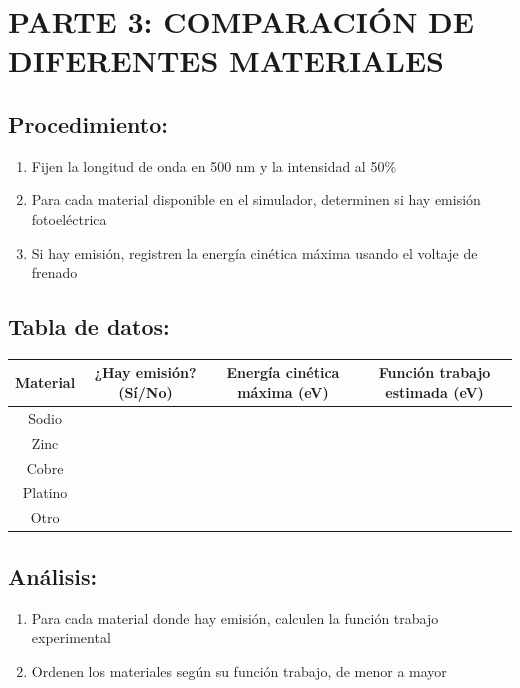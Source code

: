 \documentclass[12pt,a4paper]{article}
\begin{document}
	\section{PARTE 3: COMPARACIÓN DE DIFERENTES MATERIALES}
	
	\subsection{Procedimiento:}
	\begin{enumerate}
		\item Fijen la longitud de onda en 500 nm y la intensidad al 50\%
		\item Para cada material disponible en el simulador, determinen si hay emisión fotoeléctrica
		\item Si hay emisión, registren la energía cinética máxima usando el voltaje de frenado
	\end{enumerate}
	
	\subsection{Tabla de datos:}
	
	\begin{center}
		\begin{tabular}{|c|c|c|c|}
			\hline
			\textbf{Material} & \textbf{¿Hay emisión? (Sí/No)} & \textbf{Energía cinética máxima (eV)} & \textbf{Función trabajo estimada (eV)} \\
			\hline
			Sodio & & & \\
			\hline
			Zinc & & & \\
			\hline
			Cobre & & & \\
			\hline
			Platino & & & \\
			\hline
			Otro & & & \\
			\hline
		\end{tabular}
	\end{center}
	
	\subsection{Análisis:}
	\begin{enumerate}
		\item Para cada material donde hay emisión, calculen la función trabajo experimental
		\item Ordenen los materiales según su función trabajo, de menor a mayor
	\end{enumerate}
	
\end{document}
